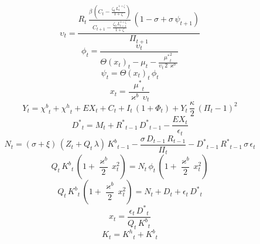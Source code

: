 \begin{dmath}
{\upsilon}_{t}=\frac{{R}_{t}\, \frac{{\beta}\, \left({C}_{t}-\frac{{\zeta_{0}}\, {L}_{t}^{1+{\zeta}}}{1+{\zeta}}\right)}{{C}_{t+1}-\frac{{\zeta_{0}}\, {L}_{t+1}^{1+{\zeta}}}{1+{\zeta}}}\, \left(1-{\sigma}+{\sigma}\, {\psi}_{t+1}\right)}{{\Pi}_{t+1}}
\end{dmath}
\begin{dmath}
{\phi}_{t}=\frac{{\upsilon}_{t}}{{\Theta(x_{t})}_{t}-{\mu}_{t}-\frac{{\mu^{*}}_{t}^{2}}{{\upsilon}_{t}\, 2\, {\varkappa^{b}}}}
\end{dmath}
\begin{dmath}
{\psi}_{t}={\Theta(x_{t})}_{t}\, {\phi}_{t}
\end{dmath}
\begin{dmath}
{x}_{t}=\frac{{\mu^{*}}_{t}}{{\varkappa^{b}}\, {\upsilon}_{t}}
\end{dmath}
\begin{dmath}
{Y}_{t}={\chi^{b}}_{t}+{\chi^{h}}_{t}+{EX}_{t}+{C}_{t}+{I}_{t}\, \left(1+{\Phi}_{t}\right)+{Y}_{t}\, \frac{{\kappa}}{2}\, \left({\Pi}_{t}-1\right)^{2}
\end{dmath}
\begin{dmath}
{D^{*}}_{t}={M}_{t}+{R^{*}}_{t-1}\, {D^{*}}_{t-1}-\frac{{EX}_{t}}{{\epsilon}_{t}}
\end{dmath}
\begin{dmath}
{N}_{t}=\left({\sigma}+{\xi}\right)\, \left({Z}_{t}+{Q}_{t}\, {\lambda}\right)\, {K^{b}}_{t-1}-\frac{{\sigma}\, {D}_{t-1}\, {R}_{t-1}}{{\Pi}_{t}}-{D^{*}}_{t-1}\, {R^{*}}_{t-1}\, {\sigma}\, {\epsilon}_{t}
\end{dmath}
\begin{dmath}
{Q}_{t}\, {K^{b}}_{t}\, \left(1+\frac{{\varkappa^{b}}}{2}\, {x}_{t}^{2}\right)={N}_{t}\, {\phi}_{t}\, \left(1+\frac{{\varkappa^{b}}}{2}\, {x}_{t}^{2}\right)
\end{dmath}
\begin{dmath}
{Q}_{t}\, {K^{b}}_{t}\, \left(1+\frac{{\varkappa^{b}}}{2}\, {x}_{t}^{2}\right)={N}_{t}+{D}_{t}+{\epsilon}_{t}\, {D^{*}}_{t}
\end{dmath}
\begin{dmath}
{x}_{t}=\frac{{\epsilon}_{t}\, {D^{*}}_{t}}{{Q}_{t}\, {K^{b}}_{t}}
\end{dmath}
\begin{dmath}
{K}_{t}={K^{h}}_{t}+{K^{b}}_{t}
\end{dmath}
